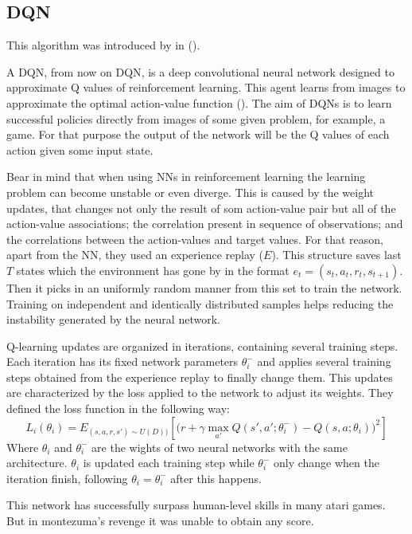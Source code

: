 \subsection{\acl{DQN}}
This algorithm was introduced by \citeauthor{mnih2015human} in  (\citeyear{mnih2015human}).

A \acl{DQN}, from now on \ac{DQN}, is a deep convolutional neural network designed to approximate Q values of reinforcement learning.
This agent learns from images to approximate the optimal action-value function ().
The aim of \acp{DQN} is to learn successful policies directly from images of some given problem, for example, a game.
For that purpose the output of the network will be the Q values of each action given some input state.

Bear in mind that when using \acp{NN} in reinforcement learning the learning problem can become unstable or even diverge.
This is caused by the weight updates, that changes not only the result of som action-value pair but all of the action-value associations;
the correlation present in sequence of observations;
and the correlations between the action-values and target values.
For that reason, apart from the \ac{NN}, they used an experience replay ($E$).
This structure saves last $T$ states which the environment has gone by in the format $e_t=(s_t ,a_t , r_t , s_{t+1})$.
Then it picks in an uniformly random manner from this set to train the network.
Training on independent and identically distributed samples helps reducing the instability generated by the neural network.

Q-learning updates are organized in iterations, containing several training steps.
Each iteration has its fixed network
parameters $\theta^-_i$ and applies several training steps obtained from the experience replay to finally change them.
This updates are characterized by the loss applied to the network to adjust its weights.
They defined the loss function in the following way:
\begin{equation}
    L_i(\theta_i)=E_{(s,a,r,s') \sim U(D))} \left [ \bigg(r+\gamma \max_{a'}Q(s',a';\theta_i^-)-Q(s,a;\theta_i)\bigg )^2\right ]
\end{equation}
Where $\theta_i$ and $\theta^-_i$ are the wights of two neural networks with the same architecture.
$\theta_i$ is updated each training step while $\theta^-_i$ only change when the iteration finish, following
$\theta_i = \theta^-_i$ after this happens.

This network has successfully surpass human-level skills in many atari games.
But in montezuma's revenge it was unable to obtain any score.

